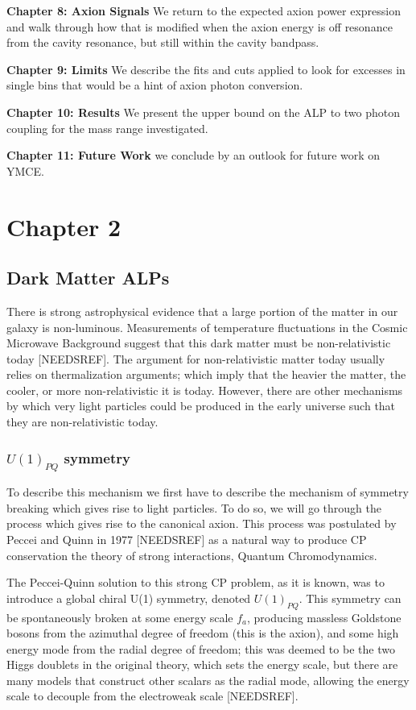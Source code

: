 \documentclass[12pt, twoside]{book}
\begin{document}
\textbf{Chapter 8: Axion Signals} We return to the expected axion power expression and walk through how that is modified when the axion energy is off resonance from the cavity resonance, but still within the cavity bandpass.

\textbf{Chapter 9:  Limits} We describe the fits and cuts applied to look for excesses in single bins that would be a hint of axion photon conversion.

\textbf{Chapter 10: Results} We present the upper bound on the ALP to two photon coupling for the mass range investigated.

\textbf{Chapter 11: Future Work} we conclude by an outlook for future work on YMCE.

\chapter{Chapter 2}
\section{Dark Matter ALPs}

There is strong astrophysical evidence that a large portion of the matter in our galaxy is non-luminous. Measurements of temperature fluctuations in the Cosmic Microwave Background suggest that this dark matter must be non-relativistic today [NEEDSREF]. The argument for non-relativistic matter today usually relies on thermalization arguments; which imply that the heavier the matter, the cooler, or more non-relativistic it is today. However, there are other mechanisms by which very light particles could be produced in the early universe such that they are non-relativistic today.

\subsection{$U(1)_{PQ}$ symmetry}

To describe this mechanism we first have to describe the mechanism of symmetry breaking which gives rise to light particles. To do so, we will go through the process which gives rise to the canonical axion. This process was postulated by Peccei and Quinn in 1977 [NEEDSREF] as a natural way to produce CP conservation the theory of strong interactions, Quantum Chromodynamics. 

The Peccei-Quinn solution to this strong CP problem, as it is known, was to introduce a global chiral U(1) symmetry, denoted $U(1)_{PQ}$. This symmetry can be spontaneously broken at some energy scale $f_a$, producing massless Goldstone bosons from the azimuthal degree of freedom (this is the axion), and some high energy mode from the radial degree of freedom; this was deemed to be the two Higgs doublets in the original theory, which sets the energy scale, but there are many models that construct other scalars as the radial mode, allowing the energy scale to decouple from the electroweak scale [NEEDSREF].
\end{document}
